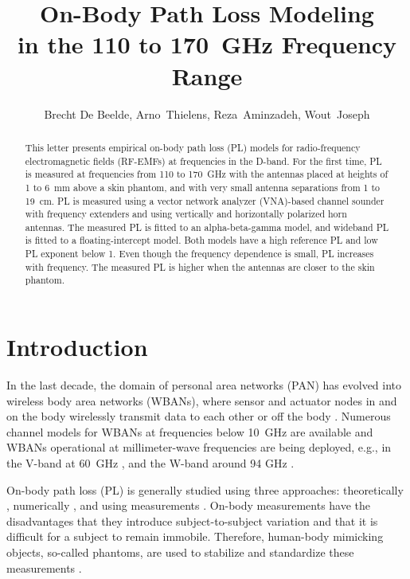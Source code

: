\documentclass[preprint]{rsl}
\title{On-Body Path Loss Modeling\\ in the 110 to 170~GHz Frequency Range}
\author{Brecht De Beelde,
Arno~Thielens,
Reza~Aminzadeh,
Wout~Joseph
}
\begin{document}
\maketitle

%
%

\begin{abstract}
This letter presents empirical on-body path loss (PL) models for radio-frequency electromagnetic fields (RF-EMFs) at frequencies in the D-band. 
For the first time, PL is measured at frequencies from 110 to 170~GHz with the antennas placed at heights of 1 to 6~mm above a skin phantom, and with very small antenna separations from 1 to 19~cm.
PL is measured using a vector network analyzer (VNA)-based channel sounder with frequency extenders and using vertically and horizontally polarized horn antennas. 
The measured PL is fitted to an alpha-beta-gamma model, and wideband PL is fitted to a floating-intercept model.
Both models have a high reference PL and low PL exponent below 1. 
Even though the frequency dependence is small, PL increases with frequency. 
The measured PL is higher when the antennas are closer to the skin phantom.
\end{abstract}

\section{Introduction\label{sect:intro}}

In the last decade, the domain of personal area networks (PAN) has evolved into wireless body area networks (WBANs), where sensor and actuator nodes in and on the body wirelessly transmit data to each other \cite{Patel2010} or off the body \cite{Marinova2015}. 
Numerous channel models for WBANs at frequencies below 10~GHz are available \cite{VanRoy2010} and WBANs operational at millimeter-wave frequencies are being deployed, e.g., in the V-band at 60~GHz \cite{Chahat2013,Petrillo2014,Aminzadeh2021_tap}, and the W-band around 94 GHz \cite{Brizzi2013,Ali2022}.

On-body path loss (PL) is generally studied using three approaches: theoretically \cite{Chahat2013,Petrillo2014}, numerically \cite{Reusens2009}, and using measurements \cite{Chahat2013,Reusens2009,Aminzadeh2021_tap}. 
On-body measurements have the disadvantages that they introduce subject-to-subject variation \cite{Proesmans2022} and that it is difficult for a subject to remain immobile. 
Therefore, human-body mimicking objects, so-called phantoms, are used to stabilize and standardize these measurements \cite{Chahat2013}. 
\end{document}
